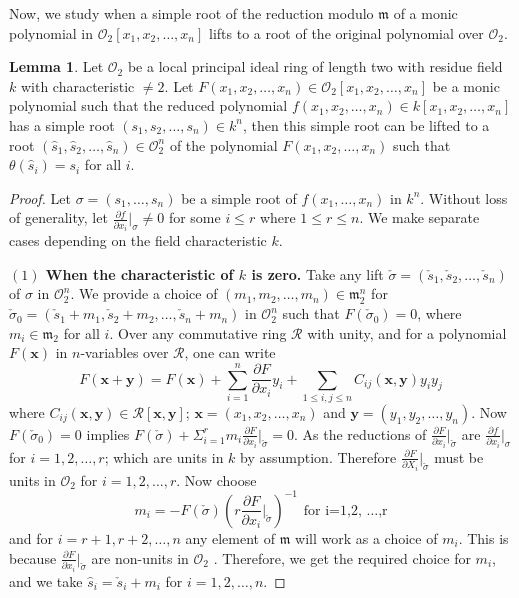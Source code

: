 \documentclass[10pt,twoside]{amsart}
\newcommand{\R}{\mathcal{O}_2}
\theoremstyle{definition}
\theoremstyle{definition}
\newtheorem{lemma}[theorem]{Lemma}
\begin{document}
Now, we study when a simple root of the reduction modulo $\mathfrak{m}$ of a monic polynomial in $\R[x_1,x_2,\ldots,x_n]$ lifts to a root of the original polynomial over $\R$.
\begin{lemma}\label{liftingsimple}
Let $\R$ be a local principal ideal ring of length two with residue field $k$ with characteristic $\neq 2$. Let $F(x_1,x_2,\ldots , x_n)\in \R[x_1,x_2,\ldots, x_n]$ be a monic polynomial such that the reduced polynomial $f(x_1,x_2,\ldots, x_n)\in k[x_1,x_2,\ldots, x_n]$ has a simple root $(s_1,s_2,\ldots, s_n)\in k^n$, then this simple root can be lifted to a root $(\hat s_1,\hat s_2,\ldots, \hat s_n) \in \R^n$ of the polynomial $F(x_1, x_2, \ldots, x_n)$ such that $\theta(\hat s_i) = s_i$ for all $i$. 
\end{lemma}
\begin{proof} Let $\sigma=(s_1, \ldots, s_n)$ be a simple root of $f(x_1, \ldots, x_n)$ in $k^n$. Without loss of generality, let $\frac{\partial f}{\partial x_i}|_{\sigma}\neq 0$ for some $i\leq r$ where $1\leq r\leq n$. We make separate cases depending on the field characteristic $k$. 

\noindent\textbf{$(1)$ When the characteristic of $k$ is zero.}   Take any lift $\check \sigma=(\check s_1, \check s_2, \ldots, \check s_n)$ of $\sigma$ in $\R^n$. We provide a choice of $(m_1,m_2,\ldots, m_n)\in \mathfrak{m}_2^n$ for $\check \sigma_0 = (\check s_1+m_1, \check s_2+m_2, \ldots, \check s_n + m_n)$ in $\R^n$ such that $F(\check \sigma_0) = 0$, where $m_i\in \mathfrak{m}_2$ for all $i$. Over any commutative ring $\mathcal{R}$ with unity, and for a polynomial $F(\textbf{x})$ in $n$-variables over $\mathcal{R}$, one can write $$F(\textbf{x} + \textbf{y}) = F(\textbf{x}) + \sum_{i=1}^{n} \frac{\partial F}{\partial x_i} y_i + \sum_{1 \leq i,j \leq n} C_{ij}(\textbf{x},\textbf{y}) y_i y_j$$
where $C_{ij}(\textbf{x}, \textbf{y})\in \mathcal{R}[\textbf{x}, \textbf{y}]$; $\mathbf{x}=(x_1,x_2,\ldots, x_n)$ and $\mathbf{y}=(y_1,y_2, \ldots,y_n)$.  Now $F(\check \sigma_0)=0$ implies $F(\check \sigma)+ \Sigma_{i=1}^r m_i\frac{\partial F}{\partial x_i}|_{\check \sigma} = 0$. As the reductions of $\frac{\partial F}{\partial x_i}|_{\check \sigma}$ are $\frac{\partial f}{\partial x_i}|_{\sigma}$ for $i=1,2, \ldots, r$; which are units in $k$ by assumption. Therefore $\frac{\partial F}{\partial X_i}|_{\check \sigma}$ must be units in $\R$ for $i=1,2, \ldots, r$. Now choose 
$$m_i = -F(\check \sigma)\left(r\frac{\partial F}{\partial x_i}|_{\check \sigma}\right)^{-1} \hspace{5pt} \text{for i=1,2, \ldots,r}$$ 
and for $i=r+1,r+2, \ldots, n$ any element of $\mathfrak{m}$ will work as a choice of $m_i$. This is because $\frac{\partial F}{\partial x_i}|_{\check \sigma}$ are non-units in $\R$ . Therefore, we get the required choice for $m_i$, and we take $\hat s_i= \check s_i+m_i$ for $i=1,2,\ldots,n$.


\end{proof}
\end{document}
